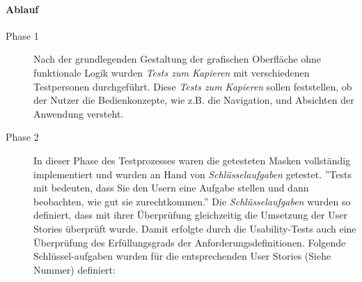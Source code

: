 \paragraph*{Ablauf}
\begin{description}

        \item[Phase 1] Nach der grundlegenden Gestaltung der grafischen Oberfläche ohne funktionale Logik wurden \textit{Tests zum Kapieren} mit verschiedenen Testpersonen durchgeführt. Diese \textit{Tests zum Kapieren} sollen feststellen, ob der Nutzer die Bedienkonzepte, wie z.B. die Navigation, und Absichten der Anwendung versteht\cite[Vgl. S. 144]{Usability}.

        \item[Phase 2] In dieser Phase des Testprozesses waren die getesteten Masken vollständig implementiert und wurden an Hand von \textit{Schlüsselaufgaben} getestet. ''Tests mit bedeuten, dass Sie den Usern eine Aufgabe stellen und dann beobachten, wie gut sie zurechtkommen\cite[Vgl. S. 144]{Usability}.'' Die \textit{Schlüsselaufgaben} wurden so definiert, dass mit ihrer Überprüfung gleichzeitig die Umsetzung der User Stories überprüft wurde. Damit erfolgte durch die Usability-Tests auch eine Überprüfung des Erfüllungsgrads der Anforderungsdefinitionen. Folgende Schlüssel-aufgaben wurden für die entsprechenden User Stories (Siehe Nummer) definiert:


\end{description}
